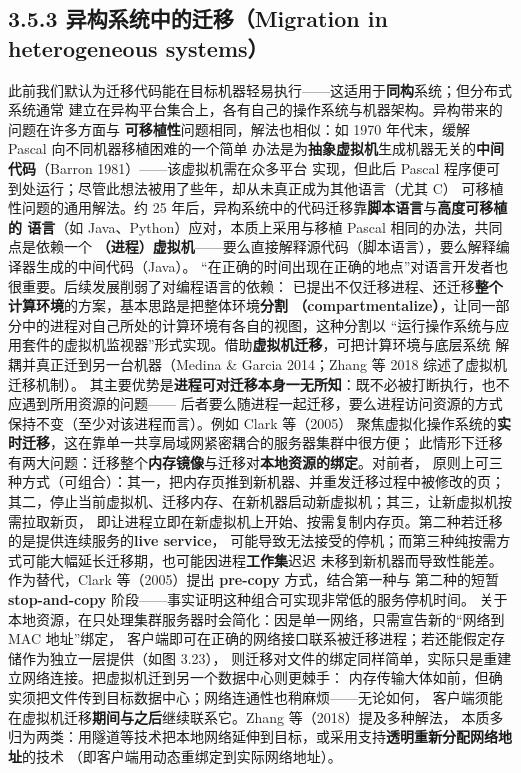 \subsection*{3.5.3 异构系统中的迁移（Migration in heterogeneous systems）}
此前我们默认为迁移代码能在目标机器轻易执行——这适用于\textbf{同构}系统；但分布式系统通常
建立在异构平台集合上，各有自己的操作系统与机器架构。异构带来的问题在许多方面与
\textbf{可移植性}问题相同，解法也相似：如 1970 年代末，缓解 Pascal 向不同机器移植困难的一个简单
办法是为\textbf{抽象虚拟机}生成机器无关的\textbf{中间代码}（Barron 1981）——该虚拟机需在众多平台
实现，但此后 Pascal 程序便可到处运行；尽管此想法被用了些年，却从未真正成为其他语言（尤其 C）
可移植性问题的通用解法。约 25 年后，异构系统中的代码迁移靠\textbf{脚本语言}与\textbf{高度可移植的
语言}（如 Java、Python）应对，本质上采用与移植 Pascal 相同的办法，共同点是依赖一个
\textbf{（进程）虚拟机}——要么直接解释源代码（脚本语言），要么解释编译器生成的中间代码（Java）。
“在正确的时间出现在正确的地点”对语言开发者也很重要。后续发展削弱了对编程语言的依赖：
已提出不仅迁移进程、还迁移\textbf{整个计算环境}的方案，基本思路是把整体环境\textbf{分割
（compartmentalize）}，让同一部分中的进程对自己所处的计算环境有各自的视图，这种分割以
“运行操作系统与应用套件的虚拟机监视器”形式实现。借助\textbf{虚拟机迁移}，可把计算环境与底层系统
解耦并真正迁到另一台机器（Medina \& Garcia 2014；Zhang 等 2018 综述了虚拟机迁移机制）。
其主要优势是\textbf{进程可对迁移本身一无所知}：既不必被打断执行，也不应遇到所用资源的问题——
后者要么随进程一起迁移，要么进程访问资源的方式保持不变（至少对该进程而言）。例如 Clark 等（2005）
聚焦虚拟化操作系统的\textbf{实时迁移}，这在靠单一共享局域网紧密耦合的服务器集群中很方便；
此情形下迁移有两大问题：迁移整个\textbf{内存镜像}与迁移对\textbf{本地资源的绑定}。对前者，
原则上可三种方式（可组合）：其一，把内存页推到新机器、并重发迁移过程中被修改的页；
其二，停止当前虚拟机、迁移内存、在新机器启动新虚拟机；其三，让新虚拟机按需拉取新页，
即让进程立即在新虚拟机上开始、按需复制内存页。第二种若迁移的是提供连续服务的\textbf{live service}，
可能导致无法接受的停机；而第三种纯按需方式可能大幅延长迁移期，也可能因进程\textbf{工作集}迟迟
未移到新机器而导致性能差。作为替代，Clark 等（2005）提出 \textbf{pre-copy} 方式，结合第一种与
第二种的短暂 \textbf{stop-and-copy} 阶段——事实证明这种组合可实现非常低的服务停机时间。
关于本地资源，在只处理集群服务器时会简化：因是单一网络，只需宣告新的“网络到 MAC 地址”绑定，
客户端即可在正确的网络接口联系被迁移进程；若还能假定存储作为独立一层提供（如图 3.23），
则迁移对文件的绑定同样简单，实际只是重建立网络连接。把虚拟机迁到另一个数据中心则更棘手：
内存传输大体如前，但确实须把文件传到目标数据中心；网络连通性也稍麻烦——无论如何，
客户端须能在虚拟机迁移\textbf{期间与之后}继续联系它。Zhang 等（2018）提及多种解法，
本质多归为两类：用隧道等技术把本地网络延伸到目标，或采用支持\textbf{透明重新分配网络地址}的技术
（即客户端用动态重绑定到实际网络地址）。

